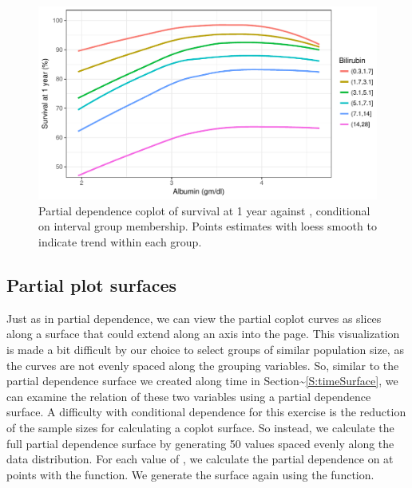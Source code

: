 \documentclass[article]{jss}
\begin{document}
\begin{Schunk}
\begin{figure}[!htb]

{\centering \includegraphics{fig-rfs/rfs-albumin-bili-1} 

}

\caption[Partial dependence coplot of survival at 1 year against , conditional on  interval group membership]{Partial dependence coplot of survival at 1 year against , conditional on  interval group membership. Points estimates with loess smooth to indicate trend within each group.}\label{fig:albumin-bili}
\end{figure}
\end{Schunk}

\subsection{Partial plot surfaces}\label{S:partialSurface}

Just as in partial dependence, we can view the partial coplot curves as
slices along a surface that could extend along an axis into the page.
This visualization is made a bit difficult by our choice to select
groups of similar population size, as the curves are not evenly spaced
along the grouping variables. So, similar to the partial dependence
surface we created along time in
Section\textasciitilde{}\ref{S:timeSurface}, we can examine the relation
of these two variables using a partial dependence surface. A difficulty
with conditional dependence for this exercise is the reduction of the
sample sizes for calculating a coplot surface. So instead, we calculate
the full partial dependence surface by generating 50 
values spaced evenly along the data distribution. For each value of
, we calculate the partial dependence on  at
 points with the  function. We
generate the surface again using the  function.
\end{document}
